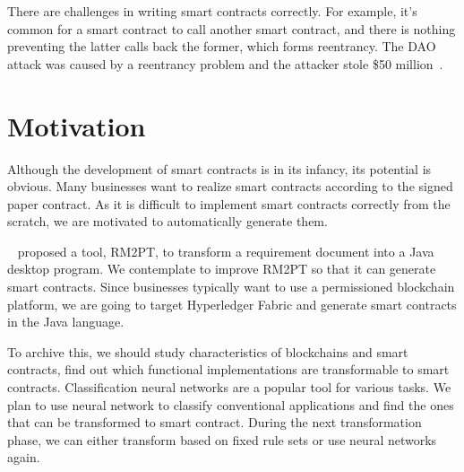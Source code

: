 There are challenges in writing smart contracts correctly.
For example, it's common for a smart contract to call another smart contract, and there is nothing preventing the latter calls back the former, which forms reentrancy.
The DAO attack was caused by a reentrancy problem and the attacker stole \$50 million~\cite{dao-attack}.


\section{Motivation}


Although the development of smart contracts is in its infancy, its potential is obvious. Many businesses want to realize smart contracts according to the signed paper contract.
As it is difficult to implement smart contracts correctly from the scratch,
we are motivated to automatically generate them.

~\cite{yang2019automated} proposed a tool, RM2PT, to transform a requirement document into a Java desktop program.
We contemplate to improve RM2PT so that it can generate smart contracts.
Since businesses typically want to use a permissioned blockchain platform, we are going to target Hyperledger Fabric and generate smart contracts in the Java language.

To archive this, we should study characteristics of blockchains and smart contracts, find out which functional implementations are transformable to smart contracts.
Classification neural networks are a popular tool for various tasks.
We plan to use neural network to classify conventional applications and find the ones that can be transformed to smart contract.
During the next transformation phase, we can either transform based on fixed rule sets or use neural networks again.







